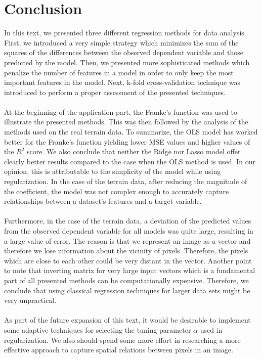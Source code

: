 \documentclass [11pt]{article}
\begin{document}
\section*{Conclusion}
In this text, we presented three different regression methods for data analysis. First, we introduced a very simple strategy which minimizes the sum of the squares of the differences between the observed dependent variable and those predicted by the model. Then, we presented more sophisticated methods which penalize the number of features in a model in order to only keep the most important features in the model. Next, k-fold cross-validation technique was introduced to perform a proper assessment of the presented techniques.\\
\\
At the beginning of the application part, the Franke's function was used to illustrate the presented methods. This was then followed by the analysis of the methods used on the real terrain data. To summarize, the OLS model has worked better for the Franke's function yielding lower MSE values and higher values of the $R^{2}$ score. We also conclude that neither the Ridge nor Lasso model offer clearly better results compared to the case when the OLS method is used. In our opinion, this is attributable to the simplicity of the model while using regularization. In the case of the terrain data, after reducing the magnitude of the coefficient, the model was not complex enough to accurately capture relationships between a dataset’s features and a target variable.  \\
\\
Furthermore, in the case of the terrain data, a deviation of the predicted values from the observed dependent variable for all models was quite large, resulting in a large value of error. The reason is that we represent an image as a vector and therefore we lose information about the vicinity of pixels. Therefore, the pixels which are close to each other could be very distant in the vector. Another point to note that inverting matrix for very large input vectors which is a fundamental part of all presented methods can be computationally expensive. Therefore, we conclude that using classical regression techniques for larger data sets might be very unpractical.\\
\\
As part of the future expansion of this text, it would be desirable to implement some adaptive techniques for selecting the tuning parameter $\alpha$ used in regularization. We also should spend some more effort in researching a more effective approach to capture spatial relations between pixels in an image.
\end{document}
